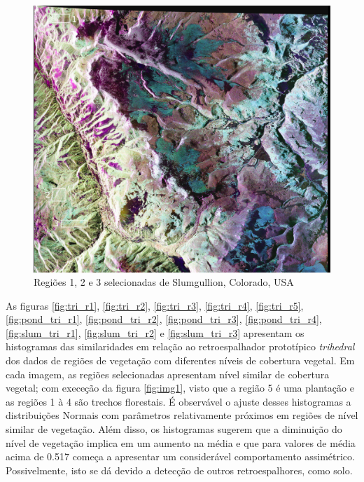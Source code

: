 \documentclass[12pt]{article}
\begin{document}
\begin{figure}[!h]
    \centering
    \includegraphics[width = 0.9\linewidth]{../../Images/Report_18_12_20/slum.png}
    \caption{Regiões 1, 2 e 3 selecionadas de Slumgullion, Colorado, USA}
    \label{fig:img3}
\end{figure}
\newpage
As figuras \ref{fig:tri_r1}, \ref{fig:tri_r2}, \ref{fig:tri_r3}, \ref{fig:tri_r4}, \ref{fig:tri_r5}, \ref{fig:pond_tri_r1}, \ref{fig:pond_tri_r2}, \ref{fig:pond_tri_r3}, \ref{fig:pond_tri_r4}, \ref{fig:slum_tri_r1}, \ref{fig:slum_tri_r2} e \ref{fig:slum_tri_r3} apresentam os histogramas das similaridades em relação ao retroespalhador prototípico \textit{trihedral} dos dados de regiões de vegetação com diferentes níveis de cobertura vegetal. Em cada imagem, as regiões selecionadas apresentam nível similar de cobertura vegetal; com execeção da figura \ref{fig:img1}, visto que a região 5 é uma plantação e as regiões 1 à 4 são trechos florestais. É observável o ajuste desses histogramas a distribuições Normais com parâmetros relativamente próximos em regiões de nível similar de vegetação. Além disso, os histogramas sugerem que a diminuição do nível de vegetação implica em um aumento na média e que para valores de média acima de 0.517 começa a apresentar um considerável comportamento assimétrico. Possivelmente, isto se dá devido a detecção de outros retroespalhores, como solo.

\newpage
\end{document}
